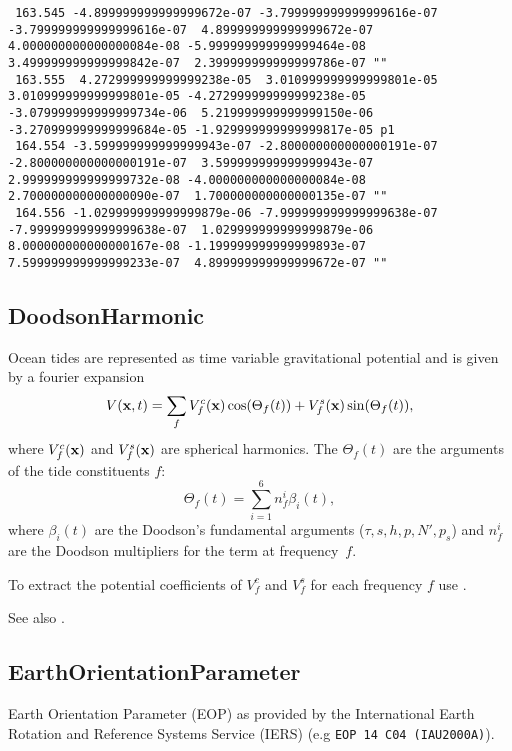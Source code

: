 \begin{verbatim}
 163.545 -4.899999999999999672e-07 -3.799999999999999616e-07 -3.799999999999999616e-07  4.899999999999999672e-07  4.000000000000000084e-08 -5.999999999999999464e-08  3.499999999999999842e-07  2.399999999999999786e-07 ""
 163.555  4.272999999999999238e-05  3.010999999999999801e-05  3.010999999999999801e-05 -4.272999999999999238e-05 -3.079999999999999734e-06  5.219999999999999150e-06 -3.270999999999999684e-05 -1.929999999999999817e-05 p1
 164.554 -3.599999999999999943e-07 -2.800000000000000191e-07 -2.800000000000000191e-07  3.599999999999999943e-07  2.999999999999999732e-08 -4.000000000000000084e-08  2.700000000000000090e-07  1.700000000000000135e-07 ""
 164.556 -1.029999999999999879e-06 -7.999999999999999638e-07 -7.999999999999999638e-07  1.029999999999999879e-06  8.000000000000000167e-08 -1.199999999999999893e-07  7.599999999999999233e-07  4.899999999999999672e-07 ""
\end{verbatim}


\subsection{DoodsonHarmonic}\label{general.fileFormat:doodsonHarmonic}
Ocean tides are represented as time variable gravitational potential
and is given by a fourier expansion
\begin{equation}
V(\mathbf{x},t) = \sum_{f} V_f^c(\mathbf{x})\cos(\Theta_f(t)) + V_f^s(\mathbf{x})\sin(\Theta_f(t)),
\end{equation}
where $V_f^c(\mathbf{x})$ and $V_f^s(\mathbf{x})$ are spherical harmonics.
The $\Theta_f(t)$ are the arguments of the tide constituents $f$:
\begin{equation}
\Theta_f(t) = \sum_{i=1}^6 n_f^i\beta_i(t),
\end{equation}
where $\beta_i(t)$ are the Doodson's fundamental arguments ($\tau,s,h,p,N',p_s$) and $n_f^i$
are the Doodson multipliers for the term at frequency~$f$.

To extract the potential coefficients of $V_f^c$ and $V_f^s$
for each frequency $f$ use .

See also .


\subsection{EarthOrientationParameter}\label{general.fileFormat:earthOrientationParameter}
Earth Orientation Parameter (EOP) as provided by the International Earth Rotation and Reference Systems Service (IERS) (e.g \verb|EOP 14 C04 (IAU2000A)|).

